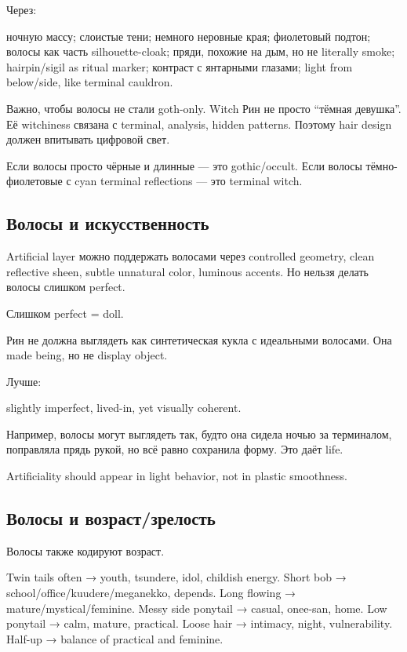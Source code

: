 Через:

ночную массу; слоистые тени; немного неровные края; фиолетовый подтон;
волосы как часть silhouette-cloak; пряди, похожие на дым, но не
literally smoke; hairpin/\hspace{0pt}sigil as ritual marker; контраст с янтарными
глазами; light from below/\hspace{0pt}side, like terminal cauldron.

Важно, чтобы волосы не стали goth-only. Witch Рин не просто ``тёмная
девушка''. Её witchiness связана с terminal, analysis, hidden patterns.
Поэтому hair design должен впитывать цифровой свет.

Если волосы просто чёрные и длинные --- это gothic/\hspace{0pt}occult. Если волосы
тёмно-фиолетовые с cyan terminal reflections --- это terminal witch.

\subsection*{Волосы и искусственность}

Artificial layer можно поддержать волосами через controlled geometry,
clean reflective sheen, subtle unnatural color, luminous accents. Но
нельзя делать волосы слишком perfect.

Слишком perfect = doll.

Рин не должна выглядеть как синтетическая кукла с идеальными волосами.
Она made being, но не display object.

Лучше:

slightly imperfect, lived-in, yet visually coherent.

Например, волосы могут выглядеть так, будто она сидела ночью за
терминалом, поправляла прядь рукой, но всё равно сохранила форму. Это
даёт life.

Artificiality should appear in light behavior, not in plastic
smoothness.

\subsection*{Волосы и возраст/\hspace{0pt}зрелость}

Волосы также кодируют возраст.

Twin tails often → youth, tsundere, idol, childish energy. Short bob →
school/\hspace{0pt}office/\hspace{0pt}kuudere/\hspace{0pt}meganekko, depends. Long flowing →
mature/\hspace{0pt}mystical/\hspace{0pt}feminine. Messy side ponytail → casual, onee-san, home.
Low ponytail → calm, mature, practical. Loose hair → intimacy, night,
vulnerability. Half-up → balance of practical and feminine.

